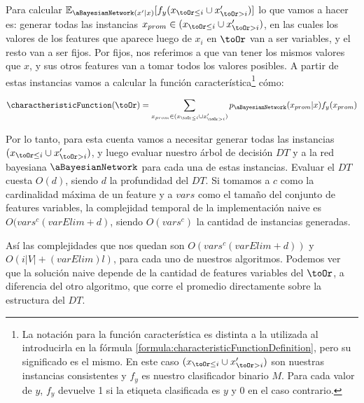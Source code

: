 Para calcular $\mathbb{E}_{\aBayesianNetwork(x' | x)}[f_y(x_{\toOr \leq i} \cup x'_{\toOr > i})]$ lo que vamos a hacer es: generar todas las instancias $x_{prom} \in (x_{\toOr \leq i} \cup x'_{\toOr > i})$, en las cuales los valores de los features que aparece luego de $x_i$ en $\toOr$ van a ser variables, y el resto van a ser fijos. Por fijos, nos referimos a que van tener los mismos valores que $x$, y sus otros features van a tomar todos los valores posibles. A partir de estas instancias vamos a calcular la función característica\footnote{La notación para la función característica es distinta a la utilizada al introducirla en la fórmula \ref{formula:characteristicFunctionDefinition}, pero su significado es el mismo. En este caso $(x_{\toOr \leq i} \cup x'_{\toOr > i})$ son nuestras instancias consistentes y $f_y$ es nuestro clasificador binario $M$. Para cada valor de $y$, $f_y$ devuelve 1 si la etiqueta clasificada es $y$ y 0 en el caso contrario.} cómo:

$$\charactheristicFunction(\toOr) = \sum_{x_{prom} \in (x_{\toOr \leq i} \cup x'_{\toOr > i})} p_\aBayesianNetwork(x_{prom} | x) f_y(x_{prom}) $$


Por lo tanto, para esta cuenta vamos a necesitar generar todas las instancias $(x_{\toOr \leq i} \cup x'_{\toOr > i})$, y luego evaluar nuestro árbol de decisión $DT$ y a la red bayesiana $\aBayesianNetwork$ para cada una de estas instancias. Evaluar el $DT$ cuesta $O(d)$, siendo $d$ la profundidad del $DT$. Si tomamos a $c$ como la cardinalidad máxima de un feature y a $vars$ como el tamaño del conjunto de features variables, la complejidad temporal de la implementación naive es $O(vars^c(varElim + d)$, siendo $O(vars^c)$ la cantidad de instancias generadas. 

Así las complejidades que nos quedan son $O(vars^c(varElim + d))$ y $O(i|V| + (varElim)l)$, para cada uno de nuestros algoritmos. Podemos ver que la solución naive depende de la cantidad de features variables del $\toOr$, a diferencia del otro algoritmo, que corre el promedio directamente sobre la estructura del $DT$.



